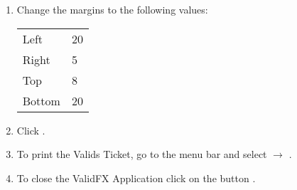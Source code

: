 \documentclass[12pt]{article}
\begin{document}
\begin{enumerate}
\item Change the margins to the following values:

\begin{tabular}[t]{ll}
Left   &  20 \\
Right  &  5  \\
Top    &  8 \\
Bottom &  20 \\
\end{tabular}

\item Click .

\item To print the Valids Ticket, go to the menu bar and select 
  $\longrightarrow$ .

\item To close the ValidFX Application click on the button .

\end{enumerate}
\end{document}

